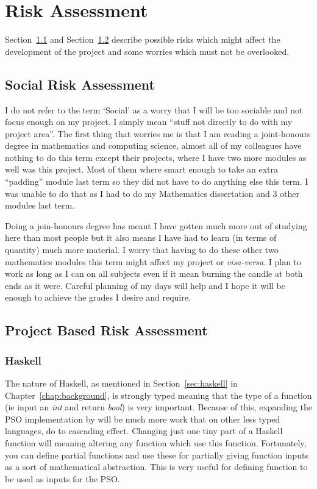 \chapter{Risk Assessment}
Section~\ref{sec:social} and Section~\ref{sec:project_based} describe possible risks which might affect the development of the project and some worries which must not be overlooked.

  \section{Social Risk Assessment} %
  \label{sec:social}
    I do not refer to the term `Social' as a worry that I will be too sociable and not focus enough on my project. I simply mean ``stuff not directly to do with my project area''. The first thing that worries me is that I am reading a joint-honours degree in mathematics and computing science, almost all of my colleagues have nothing to do this term except their projects, where I have two more modules as well was this project. Most of them where smart enough to take an extra  ``padding'' module last term so they did not have to do anything else this term. I was unable to do that as I had to do my Mathematics dissertation and 3 other modules last term. 

    Doing a join-honours degree has meant I have gotten much more out of studying here than most people but it also means I have had to learn (in terms of quantity) much more material. I worry that having to do these other two mathematics modules this term might affect my project or \textit{visa-versa}. I plan to work as long as I can on all subjects even if it mean burning the candle at both ends as it were. Careful planning of my days will help and I hope it will be enough to achieve the grades I desire and require. 
  \section{Project Based Risk Assessment} %
  \label{sec:project_based}
    \subsection{Haskell} %
    \label{sub:haskell}
      The nature of Haskell, as mentioned in Section~\ref{sec:haskell} in Chapter~\ref{chap:background}, is strongly typed meaning that the type of a function (ie input an \textit{int} and return \textit{bool}) is very important. Because of this, expanding the PSO implementation by \cite{haskellPSO} will be much more work that on other less typed languages, do to cascading effect. Changing just one tiny part of a Haskell function will meaning altering any function which use this function. Fortunately, you can define partial functions and use these for partially giving function inputs as a sort of mathematical abstraction. This is very useful for defining function to be used as inputs for the PSO. 

